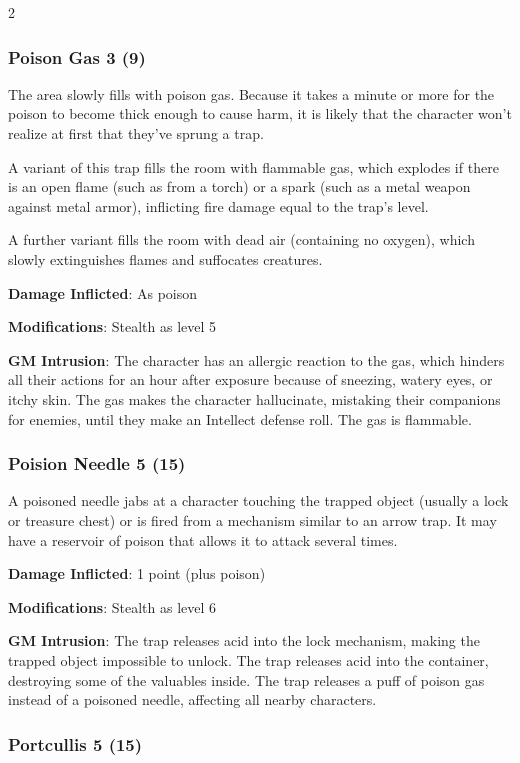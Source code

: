 \begin{multicols}{2}
\subsubsection{Poison Gas 3 (9)}

The area slowly fills with poison gas. Because it takes a minute or more for the poison to become thick enough to cause harm, it is likely that the character won’t realize at first that they’ve sprung a trap. 

A variant of this trap fills the room with flammable gas, which explodes if there is an open flame (such as from a torch) or a spark (such as a metal weapon against metal armor), inflicting fire damage equal to the trap’s level. 

A further variant fills the room with dead air (containing no oxygen), which slowly extinguishes flames and suffocates creatures. 

\textbf{Damage Inflicted}: As poison 

\textbf{Modifications}: Stealth as level 5 

\textbf{GM Intrusion}: The character has an allergic reaction to the gas, which hinders all their actions for an hour after exposure because of sneezing, watery eyes, or itchy skin. The gas makes the character hallucinate, mistaking their companions for enemies, until they make an Intellect defense roll. The gas is flammable.

\subsubsection{Poision Needle 5 (15)}

A poisoned needle jabs at a character touching the trapped object (usually a lock or treasure chest) or is fired from a mechanism similar to an arrow trap. It may have a reservoir of poison that allows it to attack several times. 

\textbf{Damage Inflicted}: 1 point (plus poison)

\textbf{Modifications}: Stealth as level 6 

\textbf{GM Intrusion}: The trap releases acid into the lock mechanism, making the trapped object impossible to unlock. The trap releases acid into the container, destroying some of the valuables inside. The trap releases a puff of poison gas instead of a poisoned needle, affecting all nearby characters.

\subsubsection{Portcullis 5 (15)}


\end{multicols}
